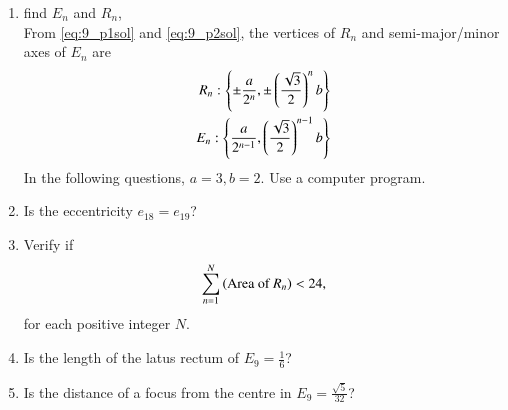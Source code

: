 \documentclass[journal,12pt,twocolumn]{IEEEtran}
\renewcommand\thesection{\arabic{section}}
\begin{document}
\begin{enumerate}[label=\thesection.\arabic*
,ref=\thesection.\theenumi]
\begin{align}
E_2: \brak{ \frac{a}{2},\frac{\sqrt{3}}{2}b}
\end{align}
%
\item find $E_n$ and $R_n$,
\\
\solution From \eqref{eq:9_p1sol} and \eqref{eq:9_p2sol}, the vertices of $R_n$ and semi-major/minor axes of $E_n$ are
\begin{align}
R_n: \left\{\pm \frac{a}{2^{n}},\pm\left(\frac{\sqrt{3}}{2}\right)^nb\right\}
\nonumber \\
E_n: \left\{ \frac{a}{2^{n-1}},\left(\frac{\sqrt{3}}{2}\right)^{n-1}b\right\}
\end{align}
In the following questions, $a=3,b=2$. Use a computer program.
\item Is the eccentricity $e_18=e_19$?
\item Verify if 
\begin{align}
\sum_{n=1}^{N}\left(\text{Area of } R_n\right) < 24, 
\end{align}
for each positive integer $N$.
\item Is the length of the latus rectum of $E_9 = \frac{1}{6}$?
\item Is the distance of a focus from the centre in $E_9 = \frac{\sqrt{5}}{32}$?
\end{enumerate}
\end{document}
